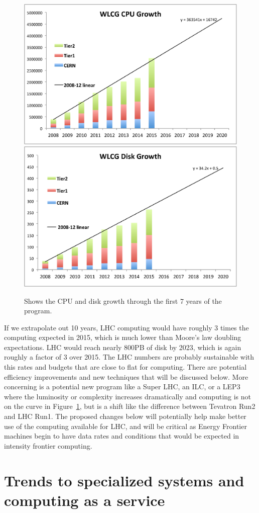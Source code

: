 \begin{figure}[htb]
\begin{center}
\includegraphics[width=0.45\hsize]{CpF-E2/Growth1.eps}
\includegraphics[width=0.45\hsize]{CpF-E2/Growth2.eps}
\caption{Shows the CPU and disk growth through the first 7 years of the program.}
\label{fig:growth}
\end{center}
\end{figure}



If we extrapolate out 10 years, LHC computing would have roughly 3
times the computing expected in 2015, which is much lower than Moore's
law doubling expectations.  LHC would reach nearly 800PB of disk by
2023, which is again roughly a factor of 3 over 2015.  The LHC numbers
are probably sustainable with this rates and budgets that are close to
flat for computing.  There are potential efficiency improvements and
new techniques that will be discussed below.  More concerning is a
potential new program like a Super LHC, an ILC, or a LEP3 where the
luminosity or complexity increases dramatically and computing is not
on the curve in Figure~\ref{fig:growth}, but is a shift like the
difference between Tevatron Run2 and LHC Run1.  The proposed changes
below will potentially help make better use of the computing available
for LHC, and will be critical as Energy Frontier machines begin to
have data rates and conditions that would be expected in intensity
frontier computing.


\section{Trends to specialized systems and computing as a service}
\label{sec:comp-clouds}

